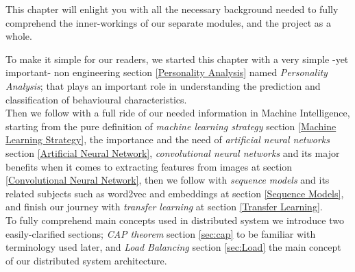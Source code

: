 


This chapter will enlight you with all the necessary background needed to fully comprehend the inner-workings of our separate modules, and the project as a whole.

To make it simple for our readers, we started this chapter with a very simple -yet important- non engineering section \ref{Personality Analysis} named \textit{Personality Analysis}; that plays an important role in understanding the prediction and classification of behavioural characteristics.\\

Then we follow with a full ride of our needed information in Machine Intelligence, starting from the pure definition of \textit{machine learning strategy} section \ref{Machine Learning Strategy}, the importance and the need of \textit{artificial neural networks} section \ref{Artificial Neural Network}, \textit{convolutional neural networks} and its major benefits when it comes to extracting features from images at section \ref{Convolutional Neural Network}, then we follow with \textit{sequence models} and its related subjects such as word2vec and embeddings at section \ref{Sequence Models}, and finish our journey with \textit{transfer learning} at section \ref{Transfer Learning}.\\

To fully comprehend main concepts used in distributed system we introduce two easily-clarified sections; \textit{CAP theorem} section \ref{sec:cap} to be familiar with terminology used later, and \textit{Load Balancing} section \ref{sec:Load} the main concept of our distributed system architecture.\\

